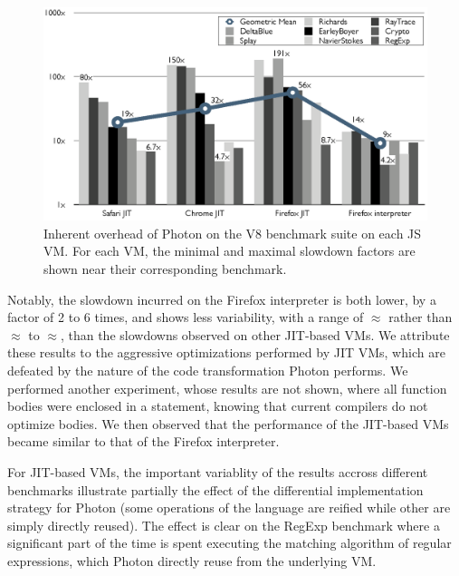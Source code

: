 \begin{figure}[htbp]
\begin{center}
\includegraphics[width=.85\textwidth]{figures/InherentOverhead}
\caption[Inherent overhead of Photon]{Inherent overhead of Photon on the V8
benchmark suite on each JS VM. For each VM, the minimal and maximal slowdown
factors are shown near their corresponding benchmark.}
\label{fig:inherent-overhead-v8-benchmarks}
\end{center}
\end{figure}

Notably, the slowdown incurred on the Firefox interpreter is both lower, by a
factor of 2 to 6 times, and shows less variability, with a range of
$\approx$ rather than $\approx$ to $\approx$,
than the slowdowns observed on other JIT-based VMs. We attribute these results
to the aggressive optimizations performed by JIT VMs, which are defeated by the
nature of the code transformation Photon performs. We performed another
experiment, whose results are not shown, where all function bodies were
enclosed in a  statement, knowing that current compilers do not
optimize  bodies. We then observed that the performance of the
JIT-based VMs became similar to that of the Firefox interpreter.

For JIT-based VMs, the important variablity of the results accross different
benchmarks illustrate partially the effect of the differential implementation
strategy for Photon (some operations of the language are reified while other
are simply directly reused). The effect is clear on the RegExp benchmark where
a significant part of the time is spent executing the matching algorithm of
regular expressions, which Photon directly reuse from the underlying VM.

